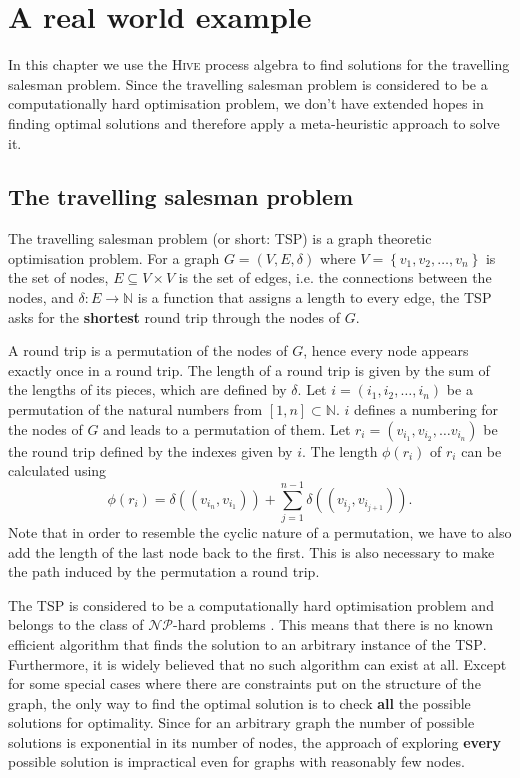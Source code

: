 \chapter{A real world example}
In this chapter we use the \textsc{Hive} process algebra to find solutions for the travelling salesman problem. Since the travelling salesman problem is considered to be a computationally hard optimisation problem, we don't have extended hopes in finding optimal solutions and therefore apply a meta-heuristic approach to solve it.

\section{The travelling salesman problem}
\label{chp:tsp}
The travelling salesman problem (or short: \textsc{TSP}) is a graph theoretic optimisation problem. For a graph $G = \left( V, E, \delta \right)$ where $V = \left\{ v_1, v_2, \ldots, v_n \right\}$ is the set of nodes, $E \subseteq V \times V$ is the set of edges, i.e. the connections between the nodes, and $\delta \colon E \to \mathbb{N}$ is a function that assigns a length to every edge, the \textsc{TSP} asks for the \textbf{shortest} round trip through the nodes of $G$.

A round trip is a permutation of the nodes of $G$, hence every node appears exactly once in a round trip. The length of a round trip is given by the sum of the lengths of its pieces, which are defined by $\delta$. Let $i = \left( i_1, i_2, \ldots, i_n \right)$ be a permutation of the natural numbers from $[1, n] \subset \mathbb{N}$. $i$ defines a numbering for the nodes of $G$ and leads to a permutation of them. Let $r_i = \left( v_{i_1}, v_{i_2}, \ldots v_{i_n} \right)$ be the round trip defined by the indexes given by $i$. The length $\phi \left( r_i \right)$ of $r_i$ can be calculated using
\begin{equation}
  \label{eqn:length_roundtrip}
  \phi \left( r_i \right) = \delta \left( \left( v_{i_n}, v_{i_1} \right) \right) + \sum_{j=1}^{n-1} \delta \left( \left( v_{i_j}, v_{i_{j+1}} \right) \right).
\end{equation}
Note that in order to resemble the cyclic nature of a permutation, we have to also add the length of the last node back to the first. This is also necessary to make the path induced by the permutation a round trip.

The \textsc{TSP} is considered to be a computationally hard optimisation problem and belongs to the class of $\mathcal{NP}$-hard problems \cite{Garey:1979:CIG:578533}. This means that there is no known efficient algorithm that finds the solution to an arbitrary instance of the \textsc{TSP}. Furthermore, it is widely believed that no such algorithm can exist at all. Except for some special cases where there are constraints put on the structure of the graph, the only way to find the optimal solution is to check \textbf{all} the possible solutions for optimality. Since for an arbitrary graph the number of possible solutions is exponential in its number of nodes, the approach of exploring \textbf{every} possible solution is impractical even for graphs with reasonably few nodes.

